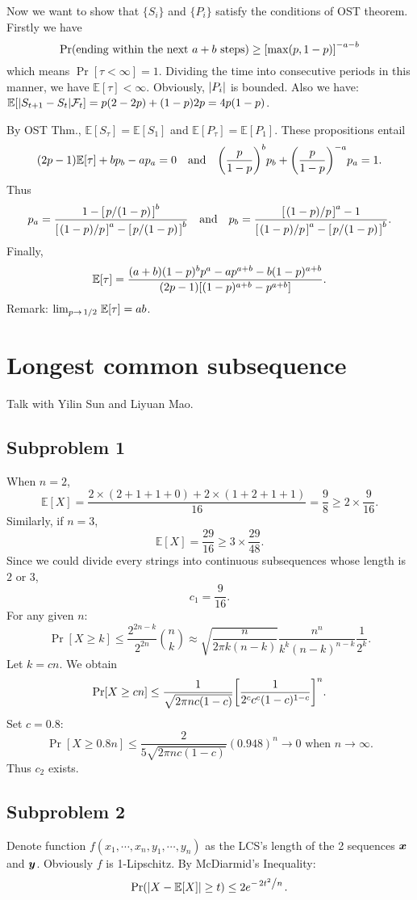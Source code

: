\documentclass{article}
\begin{document}
Now we want to show that $\{S_i\}$ and $\{P_i\}$ satisfy the conditions of OST theorem. Firstly we have 
\[
	\Pr(\text{ending within the next $a+b$ steps})\ge \qty[\max(p,1-p)]^{-a-b}
\] which means $\Pr[\tau<\infty]=1$.
Dividing the time into consecutive periods in this manner, we have $\mathbb{E}[\tau]<\infty$. Obviously, $\qty|P_i|$ is bounded. Also we have:  $\mathbb{E}[\qty|S_{t+1}-S_t|\mathcal{F}_t]=p(2-2p)+(1-p)2p=4p(1-p)$.

By OST Thm., $\mathbb{E}[S_\tau]=\mathbb{E}[S_1]$ and  $\mathbb{E}[P_\tau]=\mathbb{E}[P_1]$. These propositions entail
\[
	(2p-1)\mathbb{E}[\tau]+bp_b-ap_a=0
	\qand
	\qty(\frac{p}{1-p})^{b}p_b+\qty(\frac{p}{1-p})^{-a}p_a=1
.\] 
Thus 
\[
    p_a=
	\frac
	{1-\qty[\flatfrac{p}{(1-p)}]^b}
	{\qty[\flatfrac{(1-p)}{p}]^{a}-\qty[\flatfrac{p}{(1-p)}]^b}
	\qand
	p_b=
	\frac
	{\qty[\flatfrac{(1-p)}{p}]^{a}-1}
	{\qty[\flatfrac{(1-p)}{p}]^{a}-\qty[\flatfrac{p}{(1-p)}]^b}
.\] 
Finally,
\[
	\mathbb{E}[\tau]=\frac{(a+b)(1-p)^bp^a-ap^{a+b}-b(1-p)^{a+b}}{(2p-1)\qty[(1-p)^{a+b}-p^{a+b}]}
.\] 
Remark: $\lim_{p\to\flatfrac{1}{2}}\mathbb{E}[\tau]=ab$.

\section{Longest common subsequence}
Talk with Yilin Sun and Liyuan Mao.
\subsection*{Subproblem 1}
When $n=2$,  
\[
	\mathbb{E}[X]
	=
	\frac{2\times(2+1+1+0)+2\times(1+2+1+1)}{16}
	=
	\frac{9}{8}\ge 2\times\frac{9}{16}
.\]
Similarly, if $n=3$, 
\[
	\mathbb{E}[X]=\frac{29}{16}\ge 3\times\frac{29}{48}
.\]
Since we could divide every strings into continuous subsequences whose length is $2$ or $3$, 
\[
	c_1=\frac{9}{16}
.\]
For any given $n$:
\[
	\Pr[X\ge k]
	\le 
	\frac{2^{2n-k}}{2^{2n}}{n \choose k}
	\approx
	\sqrt{\frac{n}{2\pi k(n-k)}}\frac{n^n}{k^k(n-k)^{n-k}}\frac{1}{2^k}
.\]
Let $k=cn$. We obtain
\[
    \Pr[X\ge cn]
	\le
	\frac{1}{\sqrt{2\pi nc(1-c)}}\qty[\frac{1}{2^cc^c(1-c)^{1-c}}]^n
.\] 
Set $c=0.8$:
\[
    \Pr[X\ge 0.8n]
	\le
	\frac{2}{5\sqrt{2\pi nc(1-c)}}(0.948)^n\rightarrow 0 \text{ when } n\to\infty
.\] 
Thus $c_2$ exists.

\subsection*{Subproblem 2}

Denote function $f(x_1,\cdots,x_n,y_1,\cdots,y_n)$ as the LCS's length of the 2 sequences $\boldsymbol{x}$ and $\boldsymbol{y}$.
Obviously $f$ is 1-Lipschitz.
By McDiarmid's Inequality:
\[
	\Pr(\abs{X-\mathbb{E}[X]}\ge t)\le 2e^{-\flatfrac{2t^2}{n}}
.\] 
\end{document}
